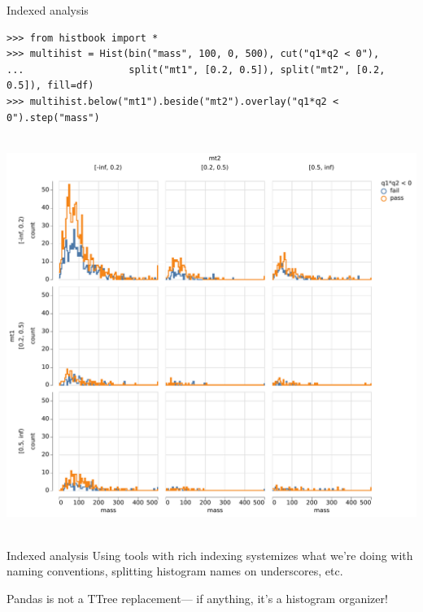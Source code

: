 \documentclass[aspectratio=169]{beamer}
\begin{document}
\begin{frame}[fragile]{Indexed analysis}
\begin{onlyenv}
\begin{verbatim}
>>> from histbook import *
>>> multihist = Hist(bin("mass", 100, 0, 500), cut("q1*q2 < 0"),
...                  split("mt1", [0.2, 0.5]), split("mt2", [0.2, 0.5]), fill=df)
>>> multihist.below("mt1").beside("mt2").overlay("q1*q2 < 0").step("mass")
\end{verbatim}
\mbox{ } \hfill \includegraphics[height=7 cm]{pandhist_double_trellis_overlay.pdf} \hfill \mbox{ }
\end{onlyenv}
\end{frame}

\begin{frame}{Indexed analysis}
\Large
\vspace{0.5 cm}
Using tools with rich indexing systemizes what we're doing with naming conventions, splitting histogram names on underscores, etc.

\vspace{1 cm}
Pandas is not a TTree replacement--- if anything, it's a histogram organizer!

\vspace{1 cm}
\end{frame}



\end{document}
